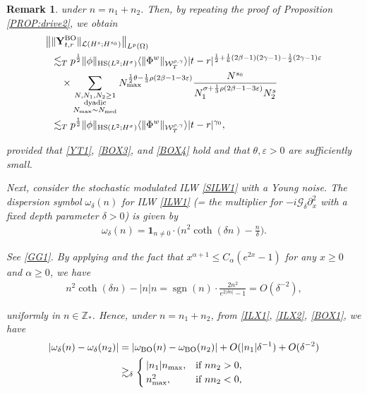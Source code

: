 \documentclass[letterpaper, 11pt,  reqno]{amsart}
\newtheorem{remark}[theorem]{Remark}
\DeclareMathOperator{\med}{med}
\DeclareMathOperator{\HS}{HS}
\DeclareMathOperator{\sgn}{sgn}
\newcommand{\1}{\hspace{0.5mm}\textup{I}\hspace{0.5mm}}
\newcommand{\noi}{\noindent}
\newcommand{\Z}{\mathbb{Z}}
\newcommand{\al}{\alpha}
\newcommand{\be}{\beta}
\newcommand{\dl}{\delta}
\newcommand{\eps}{\varepsilon}
\newcommand{\g}{\gamma}
\newcommand{\s}{\sigma}
\newcommand{\dx}{\partial_x}
\newcommand{\ta}{\theta}
\renewcommand{\o}{\omega}
\newcommand{\Gdl}{\mathcal{G}_{\dl} }
\newcommand{\les}{\lesssim}
\newcommand{\ges}{\gtrsim}
\newcommand{\jb}[1]
{\langle #1 \rangle}
\newcommand{\ind}{\mathbf 1}
\newcommand{\W}{\mathcal{W}}
\newcommand{\BO}{\text{\rm BO} }
\newcommand{\Om}{\Omega}
\newcommand{\LOP}{\mathcal{L}}
\newcommand{\YY}{\mathbf{Y}}
\numberwithin{equation}{section}
\numberwithin{theorem}{section}
\begin{document}
\begin{remark}
\noi
under $n = n_1 + n_2$.
Then, by repeating the proof of Proposition \ref{PROP:drive2}, 
we obtain
\begin{align}
\begin{split}
  \big\|  &  \| \YY^\BO_{t,r} \|_{\LOP(H^s;H^{s_0})} \big\|_{L^p(\Om)}\\
& \les_T 
p^\frac 12 
\|\phi\|_{\HS(L^2; H^\s)}
\jb{\|\Phi^w\|_{  \W^{\rho,\g}_T}}  |t- r|^{\frac 12 + \frac 16 (2\be - 1)(2\g-1) - \frac 12  (2\g-1)\eps}\\
& \quad \times \sum_{\substack{N, N_1, N_2 \ge1 \\\text{dyadic}\\
N_{\max}\sim N_{\med}}}  
N_{\max}^{\frac 12 \ta
- \frac 13\rho (2 \be - 1 -3\eps)}
\frac{N^{s_0}}{N_1^{\s+ \frac 13\rho (2 \be - 1-3\eps)} N_2^{s}}\\
& \les_T 
p^\frac 12 
\|\phi\|_{\HS(L^2; H^\s)}
\jb{\|\Phi^w\|_{  \W^{\rho,\g}_T}}  |t- r|^{\g_0}, 
\end{split}
\label{BOX2}
\end{align}




\noi
provided that 
\eqref{YT1}, 
\eqref{BOX3}, and \eqref{BOX4}
hold
and that $\ta, \eps > 0$ are sufficiently small.



Next, consider  the stochastic modulated ILW \eqref{SILW1}
with a Young noise.
The dispersion symbol  $\o_\dl(n)$ for ILW \eqref{ILW1}
(= the multiplier for $-i \Gdl \dx^2$ with a fixed depth parameter $\dl > 0$) 
is   given by 
\begin{align}
\o_\dl(n)=
\ind_{n\ne 0}\cdot \bigg(n^2 \coth(\dl n) -\frac{n}{\dl} \bigg).
\label{ILX1}
\end{align}


\noi
See \eqref{GG1}.
By applying 
\cite[(2.7)]{CLOP}
and 
the fact that  $x^{\al +1} \le C_\al( e^{2x} - 1)$ for any $x \ge  0$
and $\al \ge 0$, 
we have 
\begin{align}
n^2 \coth (\dl n) - |n|n = \sgn(n) \cdot \frac {2n^2} {e^{2|\dl n|} - 1}
= O( \dl^{-2}), 
\label{ILX2}
\end{align}

\noi
uniformly in  $n \in \Z_*$.
Hence, under $n = n_1 + n_2$, 
from \eqref{ILX1}, \eqref{ILX2}, \eqref{BOX1}, we have
\begin{align}
\begin{split}
|\o_\dl(n) - \o_\dl(n_2) |
& = |\o_\BO(n) - \o_\BO(n_2) |
+ O(|n_1|\dl^{-1})
+ O(\dl^{-2})\\
& \ges_\dl   \begin{cases}
|n_1| n_{\max}, & \text{if } nn_2 > 0,\\
 n_{\max}^2, & \text{if } nn_2 < 0, 
\end{cases}
\end{split}
\label{ILX3}
\end{align}


\end{remark}
\end{document}
